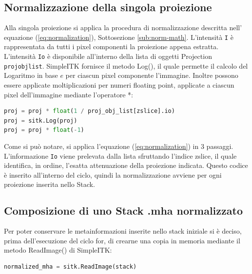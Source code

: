 \documentclass[a4paper,12pt, doubleside]{report}
\begin{document}
            \subsection{Normalizzazione della singola proiezione}
                \par
                    Alla singola proiezione si applica la procedura di normalizzazione descritta nell' equazione (\ref{eq:normalization}), Sottosezione \ref{sub:norm-math}.
                    L'intensità \texttt{I} è rappresentata da tutti i pixel componenti la proiezione appena estratta. L'intensità \texttt{Io} è disponibile all'interno della lista di oggetti Projection \texttt{proj\textunderscore obj\textunderscore list}. SimpleITK fornisce il metodo Log()\cite{sitk-log}, il quale permette il calcolo del Logaritmo in base $e$ per ciascun pixel componente l'immagine. Inoltre possono essere applicate moltiplicazioni per numeri floating point, applicate a ciascun pixel dell'immagine mediante l'operatore *:
                    \begin{lstlisting}[language=python, frame=bt]
proj = proj * float(1 / proj_obj_list[zslice].io)
proj = sitk.Log(proj)
proj = proj * float(-1)
                    \end{lstlisting} 
                    
                    Come si può notare, si applica l'equazione (\ref{eq:normalization}) in 3 passaggi. L'informazione \texttt{Io} viene prelevata dalla lista sfruttando l'indice zslice, il quale identifica, in ordine, l'esatta attenuazione della proiezione indicata. Questo codice è inserito all'interno del ciclo, quindi la normalizzazione avviene per ogni proiezione inserita nello Stack.
                             
            \subsection{Composizione di uno Stack .mha normalizzato}
                \par
                    Per poter conservare le metainformazioni inserite nello stack iniziale si è deciso, prima dell'esecuzione del ciclo for, di crearne una copia in memoria mediante il metodo ReadImage() di SimpleITK:
                    
                    \begin{lstlisting}[language=python, frame=bt]
normalized_mha = sitk.ReadImage(stack)
                    \end{lstlisting} 
                    
\end{document}
